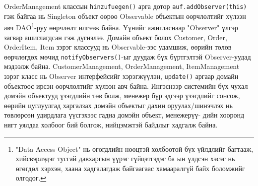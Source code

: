 OrderManagement классын \verb|hinzufuegen()| арга дотор \verb|auf.addObserver(this)| гэж байгаа нь Singleton объект өөрөө Observable объектын өөрчлөлтийг хүлээн авч DAO\footnote{"Data Access Object" нь өгөгдлийн нөөцтэй холбоотой бүх үйлдлийг багтааж, хийсвэрлэдэг тусгай давхаргын үүрэг гүйцэтгэдэг ба ын үлдсэн хэсэг нь өгөгдөл хэрхэн, хаана хадгалагдаж байгаагаас хамааралгүй байх боломжийг олгодог.}-руу өөрчлөлт илгээж байна. Үүнийг ажигласнаар "Observer" үлгэр загвар ашиглагдсан гэж дүгнэлээ. Домайн объект болох Customer, Order, OrderItem, Item зэрэг классууд нь Observable-ээс удамшиж, өөрийн төлөв өөрчлөгдөх мөчид \verb|notifyObservers()|-ыг дуудаж бүх бүртгэлтэй Observer-уудад мэдээлж байна. CustomerManagement, OrderManagement, ItemManagement зэрэг класс нь Observer интерфейсийг хэрэгжүүлэн, \verb|update()| аргаар домайн объектоос ирсэн өөрчлөлтийг хүлээн авч байна. Ингэснээр системийн бүх чухал домэйн объектууд үзэгдлийн төв болж, менежер бүр эдгээр үзэгдлийг сонсож, өөрийн цуглуулгад харгалзах домэйн объектыг дахин оруулах/шинэчлэх нь төвлөрсөн удирдлага үүсгэхээс гадна домэйн объект, менежерүү- дийн хооронд нягт уялдаа холбоог бий болгож, нийцэмжтэй байдлыг хадгалж байна.

